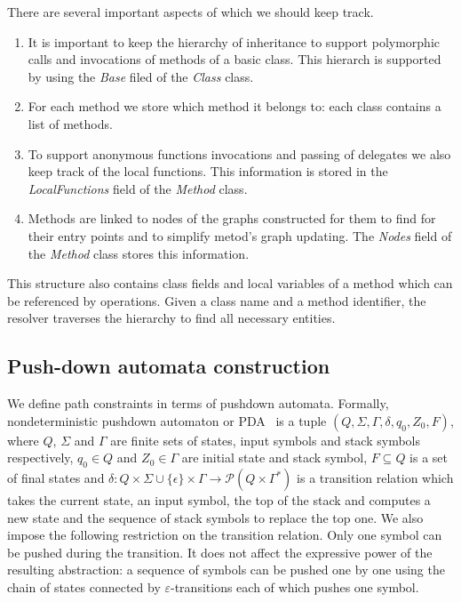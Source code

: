 There are several important aspects of which we should keep track.
\begin{enumerate}
 \item It is important to keep the hierarchy of inheritance to support polymorphic calls and invocations of methods of a basic class.
 This hierarch is supported by using the \textit{Base} filed of the \textit{Class} class.
 \item For each method we store which method it belongs to: each class contains a list of methods.
 \item To support anonymous functions invocations and passing of delegates we also keep track of the local functions.
 This information is stored in the \textit{LocalFunctions} field of the \textit{Method} class.
 \item Methods are linked to nodes of the graphs constructed for them to find for their entry points and to simplify metod's graph updating.
 The \textit{Nodes} field of the \textit{Method} class stores this information.
\end{enumerate}
This structure also contains class fields and local variables of a method which can be referenced by operations.
Given a class name and a method identifier, the resolver traverses the hierarchy to find all necessary entities.

\subsection{Push-down automata construction}

We define path constraints in terms of pushdown automata.
Formally, nondeterministic pushdown automaton or PDA~\cite{AutomataTheory} is a tuple $(Q, \Sigma, \Gamma, \delta, q_0, Z_0, F)$, where $Q$, $\Sigma$ and $\Gamma$ are finite sets of states, input symbols and stack symbols respectively, $q_0 \in Q$ and $Z_0 \in \Gamma$ are initial state and stack symbol, $F \subseteq Q$ is a set of final states and $\delta: Q \times \Sigma \cup \{\epsilon\} \times \Gamma \rightarrow \mathcal P (Q \times \Gamma^*)$ is a transition relation which takes the current state, an input symbol, the top of the stack and computes a new state and the sequence of stack symbols to replace the top one.
We also impose the following restriction on the transition relation.
Only one symbol can be pushed during the transition.
It does not affect the expressive power of the resulting abstraction: a sequence of symbols can be pushed one by one using the chain of states connected by $\varepsilon$-transitions each of which pushes one symbol.

